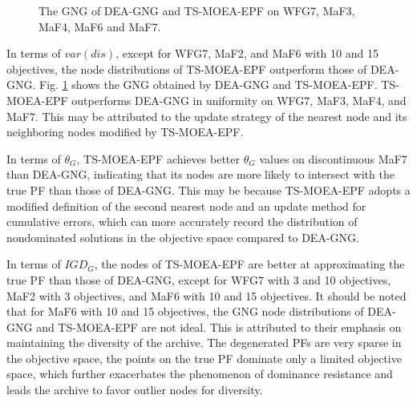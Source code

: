 \documentclass[a4paper,fleqn]{cas-dc}
\begin{document}
\begin{sloppypar}
\begin{figure}
		\caption{{The GNG of DEA-GNG and TS-MOEA-EPF on WFG7, MaF3,  MaF4, MaF6 and MaF7.}}\label{fig:GNG} 
		
	\end{figure}
	\par {In terms of $var(dis)$, except for WFG7, MaF2, and MaF6 with 10 and 15 objectives, the node distributions of TS-MOEA-EPF outperform those of DEA-GNG. Fig. \ref{fig:GNG}  shows the GNG obtained by DEA-GNG and TS-MOEA-EPF. TS-MOEA-EPF outperforms DEA-GNG in uniformity on WFG7, MaF3, MaF4, and MaF7. This may be attributed to the update  strategy of the nearest node and its neighboring nodes modified by TS-MOEA-EPF. }
	\par {In terms of $\theta_{G}$, TS-MOEA-EPF achieves better $\theta_G$ values on discontinuous MaF7 than DEA-GNG, indicating that its nodes are more likely to intersect with the true PF than those of DEA-GNG.  This may be because TS-MOEA-EPF adopts a modified definition of the second nearest node and an update method for cumulative errors, which can more accurately record the distribution of nondominated solutions in the objective space compared to DEA-GNG. } 
	\par {In terms of  $IGD_G$,  the nodes of TS-MOEA-EPF  are better at approximating the true PF than those  of DEA-GNG, except for WFG7 with 3 and 10 objectives, MaF2 with 3 objectives, and MaF6 with 10 and 15 objectives. It should be noted that for MaF6 with 10 and 15 objectives, the GNG node distributions of DEA-GNG and TS-MOEA-EPF are not ideal. This  is attributed to their emphasis on maintaining the diversity of the archive.  The degenerated PFs are very sparse in the objective space, the points on the true PF dominate  only a limited objective space, which further exacerbates the phenomenon of dominance resistance and  leads the archive to favor outlier nodes for diversity.}
	
	\begin{table}[ht]
		\centering
		\caption{{The indicator results used to measure the effectiveness of GNG adopted by DEA-GNG (superscript D) and TS-MOEA-EFP (superscript T), where "+", "-", and "=" respectively indicate that the GNG adopted by DEA-GNG is superior to, inferior to, and equivalent to the GNG adopted by TS-MOEA-EPF}}\label{Table:MAE about GNG network}
\end{table}
\end{sloppypar}
\end{document}
